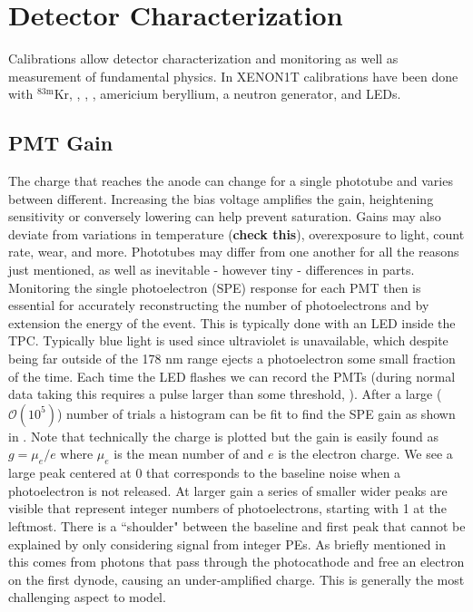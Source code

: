 {\section{Detector Characterization}
\label{sec:det_char}
Calibrations allow detector characterization and monitoring as well as measurement of fundamental physics.  In XENON1T calibrations have
been done with $\mathrm{^{83m}Kr}$, , , , americium beryllium, a neutron generator, and LEDs.


\subsection{PMT Gain}
\label{subsec:det_char_pmt_gain}
The charge that reaches the anode can change for a single phototube and varies between different.  Increasing the bias voltage amplifies
the gain, heightening sensitivity or conversely lowering can help prevent saturation.  Gains may also deviate from variations in
temperature (\textbf{check this}), overexposure to light, count rate, wear, and more.  Phototubes may differ from one another
for all the reasons just mentioned, as well as inevitable - however tiny - differences in parts.  Monitoring the single photoelectron (SPE)
response for each PMT then is essential for accurately reconstructing the number of photoelectrons and by extension the energy of the
event.  This is typically done with an LED inside the TPC.  Typically blue light is used since ultraviolet is unavailable, which despite
being far outside of the 178 nm range ejects a photoelectron some small fraction of the time.  Each time the LED flashes we can record the
PMTs (during normal data taking this requires a pulse larger than some threshold, ).  After a large
($\mathcal{O}(10^{5})$)
number of trials a histogram can be fit to find the SPE gain as shown in .  Note that technically the charge
is plotted but the gain is easily found as $g = \mu_{e} / e$ where $\mu_{e}$ is the mean number of \electron and $e$ is the electron charge.  We
see a large peak centered at 0 that corresponds to the baseline noise when a photoelectron is not released.  At larger gain a series of
smaller wider peaks are visible that represent integer numbers of photoelectrons, starting with 1 at the leftmost.  There is a ``shoulder"
between the baseline and first peak that cannot be explained by only considering signal from integer PEs.  As briefly mentioned in
 this comes from photons that pass through the photocathode and free an electron on the first dynode, causing an
under-amplified charge.  This is generally the most challenging aspect to model.

}
